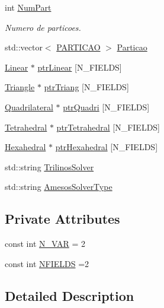 \begin{DoxyCompactItemize}
\item 
int \hyperlink{classGeProb_ab269c3e7eeb6ae7c5fd87ae54df757b2}{Num\+Part}
\begin{DoxyCompactList}\small\item\em Numero de particoes. \end{DoxyCompactList}\item 
std\+::vector$<$ \hyperlink{structPARTICAO}{P\+A\+R\+T\+I\+C\+AO} $>$ \hyperlink{classGeProb_a39012a295f18016463a00946affc3818}{Particao}
\item 
\hyperlink{classLinear}{Linear} $\ast$ \hyperlink{classGeProb_af9350545b7ee2ebe6488a50dd1f38c8c}{ptr\+Linear} \mbox{[}N\+\_\+\+F\+I\+E\+L\+DS\mbox{]}
\item 
\hyperlink{classTriangle}{Triangle} $\ast$ \hyperlink{classGeProb_a9fa6ab6ca8b9a2352642a72042d8cf4d}{ptr\+Triang} \mbox{[}N\+\_\+\+F\+I\+E\+L\+DS\mbox{]}
\item 
\hyperlink{classQuadrilateral}{Quadrilateral} $\ast$ \hyperlink{classGeProb_ada73c5b700f7681fde499a3a27ff377e}{ptr\+Quadri} \mbox{[}N\+\_\+\+F\+I\+E\+L\+DS\mbox{]}
\item 
\hyperlink{classTetrahedral}{Tetrahedral} $\ast$ \hyperlink{classGeProb_a4e2d7b57253812234e2417097659c40c}{ptr\+Tetrahedral} \mbox{[}N\+\_\+\+F\+I\+E\+L\+DS\mbox{]}
\item 
\hyperlink{classHexahedral}{Hexahedral} $\ast$ \hyperlink{classGeProb_aecb008dc7914d62933407aecbcbbae0a}{ptr\+Hexahedral} \mbox{[}N\+\_\+\+F\+I\+E\+L\+DS\mbox{]}
\item 
std\+::string \hyperlink{classGeProb_aac89bac6728a7f42998e0edb80dc835d}{Trilinos\+Solver}
\item 
std\+::string \hyperlink{classGeProb_a000f412eadf9ce5cf4f5391012283330}{Amesos\+Solver\+Type}
\end{DoxyCompactItemize}
\subsection*{Private Attributes}
\begin{DoxyCompactItemize}
\item 
const int \hyperlink{classED__Prob_a4e7d2ff1a8e435e336fb00c527224b5a}{N\+\_\+\+V\+AR} = 2
\item 
const int \hyperlink{classED__Prob_a55ae39ba5cc4f4c2c9f284d49056ef26}{N\+F\+I\+E\+L\+DS} =2
\end{DoxyCompactItemize}


\subsection{Detailed Description}


